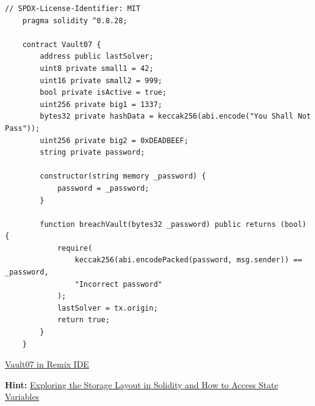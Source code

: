 \documentclass[12pt]{article}
\begin{document}
\begin{lstlisting}[language=Solidity]
    // SPDX-License-Identifier: MIT
    pragma solidity ^0.8.28;
    
    contract Vault07 {
        address public lastSolver;
        uint8 private small1 = 42;
        uint16 private small2 = 999;
        bool private isActive = true;
        uint256 private big1 = 1337;
        bytes32 private hashData = keccak256(abi.encode("You Shall Not Pass"));
        uint256 private big2 = 0xDEADBEEF;
        string private password;
    
        constructor(string memory _password) {
            password = _password;
        }
    
        function breachVault(bytes32 _password) public returns (bool) {
            require(
                keccak256(abi.encodePacked(password, msg.sender)) == _password,
                "Incorrect password"
            );
            lastSolver = tx.origin;
            return true;
        }
    }
\end{lstlisting}

\medskip
\noindent
\href{https://remix.ethereum.org/?#activate=solidity&url=https://github.com/radovluk/unbreakable-vault/contracts/Vault07.sol&lang=en&optimize=false&runs=200&evmVersion=null&version=soljson-v0.8.28+commit.7893614a.js}{Vault07 in Remix IDE}

\medskip
\noindent
\textbf{Hint:} \href{https://medium.com/@flores.eugenio03/exploring-the-storage-layout-in-solidity-and-how-to-access-state-variables-bf2cbc6f8018}{Exploring the Storage Layout in Solidity and How to Access State Variables}
\end{document}
